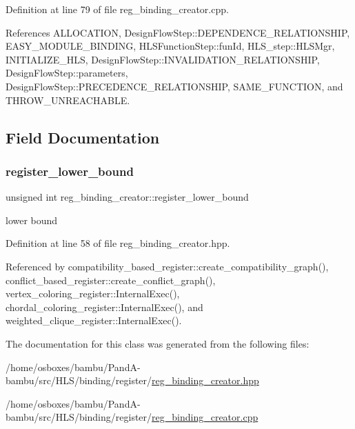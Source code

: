 Definition at line 79 of file reg\+\_\+binding\+\_\+creator.\+cpp.



References A\+L\+L\+O\+C\+A\+T\+I\+ON, Design\+Flow\+Step\+::\+D\+E\+P\+E\+N\+D\+E\+N\+C\+E\+\_\+\+R\+E\+L\+A\+T\+I\+O\+N\+S\+H\+IP, E\+A\+S\+Y\+\_\+\+M\+O\+D\+U\+L\+E\+\_\+\+B\+I\+N\+D\+I\+NG, H\+L\+S\+Function\+Step\+::fun\+Id, H\+L\+S\+\_\+step\+::\+H\+L\+S\+Mgr, I\+N\+I\+T\+I\+A\+L\+I\+Z\+E\+\_\+\+H\+LS, Design\+Flow\+Step\+::\+I\+N\+V\+A\+L\+I\+D\+A\+T\+I\+O\+N\+\_\+\+R\+E\+L\+A\+T\+I\+O\+N\+S\+H\+IP, Design\+Flow\+Step\+::parameters, Design\+Flow\+Step\+::\+P\+R\+E\+C\+E\+D\+E\+N\+C\+E\+\_\+\+R\+E\+L\+A\+T\+I\+O\+N\+S\+H\+IP, S\+A\+M\+E\+\_\+\+F\+U\+N\+C\+T\+I\+ON, and T\+H\+R\+O\+W\+\_\+\+U\+N\+R\+E\+A\+C\+H\+A\+B\+LE.



\subsection{Field Documentation}
\mbox{\label{classreg__binding__creator_ab0cd825176cd09a5231572aad899ea8f}} 
\subsubsection{\texorpdfstring{register\+\_\+lower\+\_\+bound}{register\_lower\_bound}}
{\footnotesize\ttfamily unsigned int reg\+\_\+binding\+\_\+creator\+::register\+\_\+lower\+\_\+bound\hspace{0.3cm}{\ttfamily [protected]}}



lower bound 



Definition at line 58 of file reg\+\_\+binding\+\_\+creator.\+hpp.



Referenced by compatibility\+\_\+based\+\_\+register\+::create\+\_\+compatibility\+\_\+graph(), conflict\+\_\+based\+\_\+register\+::create\+\_\+conflict\+\_\+graph(), vertex\+\_\+coloring\+\_\+register\+::\+Internal\+Exec(), chordal\+\_\+coloring\+\_\+register\+::\+Internal\+Exec(), and weighted\+\_\+clique\+\_\+register\+::\+Internal\+Exec().



The documentation for this class was generated from the following files\+:\begin{DoxyCompactItemize}
\item 
/home/osboxes/bambu/\+Pand\+A-\/bambu/src/\+H\+L\+S/binding/register/\hyperlink{reg__binding__creator_8hpp}{reg\+\_\+binding\+\_\+creator.\+hpp}\item 
/home/osboxes/bambu/\+Pand\+A-\/bambu/src/\+H\+L\+S/binding/register/\hyperlink{reg__binding__creator_8cpp}{reg\+\_\+binding\+\_\+creator.\+cpp}\end{DoxyCompactItemize}
